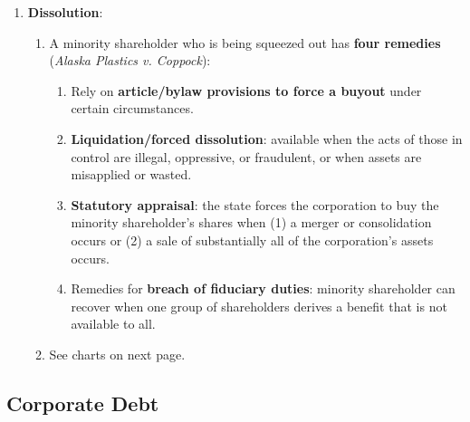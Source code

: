 \begin{enumerate}
    \item \textbf{Dissolution}:
    \begin{enumerate}
        \item A minority shareholder who is being squeezed out has 
        \textbf{four remedies} (\emph{Alaska Plastics v. Coppock}):
        \begin{enumerate}
            \item Rely on \textbf{article/bylaw provisions to force a buyout} 
            under certain circumstances.
            \item \textbf{Liquidation/forced dissolution}: available when the 
            acts of those in control are illegal, oppressive, or fraudulent, 
            or when assets are misapplied or wasted.
            \item \textbf{Statutory appraisal}: the state forces the 
            corporation to buy the minority shareholder's shares when (1) a 
            merger or consolidation occurs or (2) a sale of substantially all 
            of the corporation's assets occurs.
            \item Remedies for \textbf{breach of fiduciary duties}: minority 
            shareholder can recover when one group of shareholders derives a 
            benefit that is not available to all.
        \end{enumerate}
        \item See charts on next page.
    \end{enumerate}
\end{enumerate}



\newpage

\subsection{Corporate Debt}

